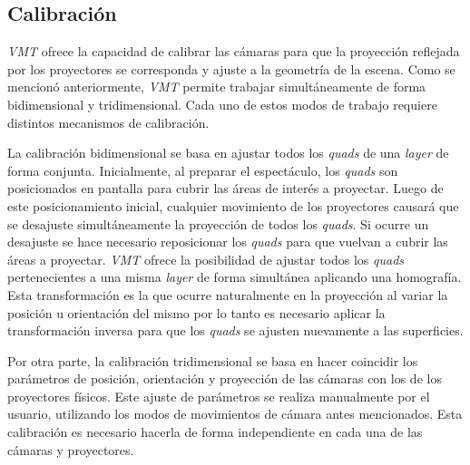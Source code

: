 

\subsection{Calibración}

\emph{VMT} ofrece la capacidad de calibrar las cámaras para que la proyección reflejada por los proyectores se corresponda y ajuste a la geometría de la escena.
Como se mencionó anteriormente, \emph{VMT} permite trabajar simultáneamente de forma bidimensional y tridimensional. Cada uno de estos modos de trabajo requiere distintos mecanismos de calibración.

La calibración bidimensional se basa en ajustar todos los \emph{quads} de una \emph{layer} de forma conjunta.
Inicialmente, al preparar el espectáculo, los \emph{quads} son posicionados en pantalla para cubrir las áreas de interés a proyectar. Luego de este posicionamiento inicial, cualquier movimiento de los proyectores causará que se desajuste simultáneamente la proyección de todos los \emph{quads}. Si ocurre un desajuste se hace necesario reposicionar los \emph{quads} para que vuelvan a cubrir las áreas a proyectar.
\emph{VMT} ofrece la posibilidad de ajustar todos los \emph{quads} pertenecientes a una misma \emph{layer} de forma simultánea aplicando una homografía. Esta transformación es la que ocurre naturalmente en la proyección al variar la posición u orientación del mismo por lo tanto es necesario aplicar la transformación inversa para que los \emph{quads} se ajusten nuevamente a las superficies.

Por otra parte, la calibración tridimensional se basa en hacer coincidir los parámetros de posición, orientación y proyección de las cámaras con los de los proyectores físicos. Este ajuste de parámetros se realiza manualmente por el usuario, utilizando los modos de movimientos de cámara antes mencionados. Esta calibración es necesario hacerla de forma independiente en cada una de las cámaras y proyectores.

